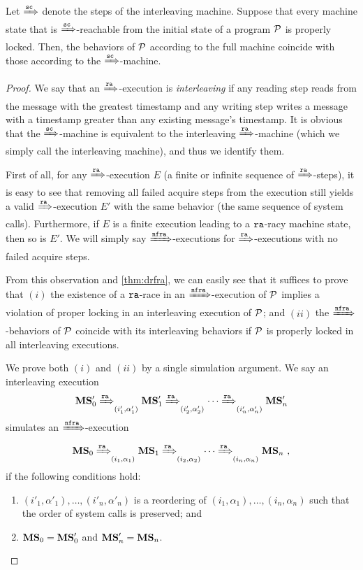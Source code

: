 \begin{theorem}
\label{thm:drflock'}
Let $\xRightarrow{{\texttt{sc}}}$ denote the steps of the interleaving machine.
Suppose that every machine state that is $\xRightarrow{{\texttt{sc}}}$-reachable from
the initial state of a program $\mathcal{P}$ is properly locked.  Then, the
behaviors of $\mathcal{P}$ according to the full machine coincide with those
according to the $\xRightarrow{{\texttt{sc}}}$-machine.
\end{theorem}
\begin{proof}

We say that an $\xRightarrow{\texttt{ra}}$-execution is \emph{interleaving} if any
reading step reads from the message with the greatest timestamp and
any writing step writes a message with a timestamp greater than any
existing message's timestamp.
It is obvious that the $\xRightarrow{{\texttt{sc}}}$-machine is equivalent to the
interleaving $\xRightarrow{\texttt{ra}}$-machine (which we simply call the
interleaving machine), and thus we identify them.

First of all, for any $\xRightarrow{\texttt{ra}}$-execution $E$ (\ie a finite or
infinite sequence of $\xRightarrow{\texttt{ra}}$-steps), it is easy to see that
removing all failed acquire steps from the execution still yields a
valid $\xRightarrow{\texttt{ra}}$-execution $E'$ with the same behavior (\ie the
same sequence of system calls). Furthermore, if $E$ is a finite
execution leading to a $\texttt{ra}$-racy machine state, then so is $E'$.  We
will simply say $\xRightarrow{\texttt{nf}\texttt{ra}}$-executions for $\xRightarrow{\texttt{ra}}$-executions
with no failed acquire steps.

From this observation and \cref{thm:drfra}, we can easily see that
it suffices to prove that $(i)$ the existence of a $\texttt{ra}$-race in an
$\xRightarrow{\texttt{nf}\texttt{ra}}$-execution of $\mathcal{P}$ implies a violation of proper
locking in an interleaving execution of $\mathcal{P}$; and $(ii)$ the
$\xRightarrow{\texttt{nf}\texttt{ra}}$-behaviors of $\mathcal{P}$ coincide with its interleaving
behaviors if $\mathcal{P}$ is properly locked in all interleaving executions.

We prove both $(i)$ and $(ii)$ by a single simulation argument.  We
say an interleaving execution
\[{\mathbf{MS}}'_0 \xRightarrow{\texttt{ra}}_{(i'_1,\alpha'_1)} {\mathbf{MS}}'_1 \xRightarrow{\texttt{ra}}_{(i'_2,\alpha'_2)}
  \cdots \xRightarrow{\texttt{ra}}_{(i'_n,\alpha'_n)} {\mathbf{MS}}'_n \] simulates an
$\xRightarrow{\texttt{nf}\texttt{ra}}$-execution
\[{\mathbf{MS}}_0 \xRightarrow{\texttt{ra}}_{(i_1,\alpha_1)} {\mathbf{MS}}_1 \xRightarrow{\texttt{ra}}_{(i_2,\alpha_2)}
  \cdots \xRightarrow{\texttt{ra}}_{(i_n,\alpha_n)} {\mathbf{MS}}_n ~,\] if the following
conditions hold:
\begin{enumerate}
\item $(i'_1,\alpha'_1),\ldots,(i'_n,\alpha'_n)$ is a reordering of
  $(i_1,\alpha_1),\ldots,(i_n,\alpha_n)$ such that the order of
  system calls is preserved; and
\item ${\mathbf{MS}}_0  = {\mathbf{MS}}'_0$ and ${\mathbf{MS}}'_n = {\mathbf{MS}}_n$. 
\end{enumerate}


\end{proof}

